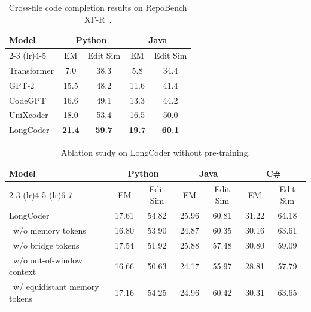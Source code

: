 \documentclass{article}
\begin{document}
\begin{table}[t]
\caption{Cross-file code completion results on RepoBench XF-R~\citep{repobench}.}
\label{table:cross_file}
\begin{center}
\begin{small}
\begin{tabular}{lcccc}
    \toprule
    \multirow{2}{*}{Model} & \multicolumn{2}{c}{Python} & \multicolumn{2}{c}{Java} \\
    \cmidrule(lr){2-3} \cmidrule(lr){4-5}
    &EM &Edit Sim&EM &Edit Sim  \\
    \midrule
    Transformer &7.0 & 38.3&5.8 & 34.4\\
    GPT-2 &15.5 & 48.2&11.6 & 41.4\\
    CodeGPT &16.6 & 49.1& 13.3 & 44.2\\
    UniXcoder& 18.0&53.4& 16.5&50.0\\
    \midrule
    LongCoder & \bf{21.4}&\bf{59.7}& \bf{19.7}&\bf{60.1}\\
    \bottomrule
\end{tabular}
\end{small}
\end{center}
\end{table}

\begin{table}[t]
\caption{Ablation study on LongCoder without pre-training. }
\label{tab:longcompletion_ablation}
\begin{center}
\begin{tabular}{lcccccc}
    \toprule
    \multirow{2}{*}{Model} &  \multicolumn{2}{c}{Python} & \multicolumn{2}{c}{Java}& \multicolumn{2}{c}{C\#} \\
    \cmidrule(lr){2-3} \cmidrule(lr){4-5} \cmidrule(lr){6-7}
    &EM &Edit Sim&EM &Edit Sim&EM &Edit Sim  \\
    \midrule
    LongCoder&17.61 &54.82 &25.96 & 60.81 &31.22 &64.18\\
    \ w/o memory tokens & 16.80 & 53.90& 24.87 & 60.35& 30.16 & 63.61\\
    \ w/o bridge tokens & 17.54&51.92&25.88&57.48&30.80&59.09\\
    \ w/o out-of-window context & 16.66 & 50.63& 24.17 &55.97& 28.81& 57.79\\
    \ w/ equidistant memory tokens & 17.16 & 54.25& 24.96 & 60.42& 30.31 &63.65\\
    
    \bottomrule
\end{tabular}
\end{center}
    
\end{table}
\end{document}
